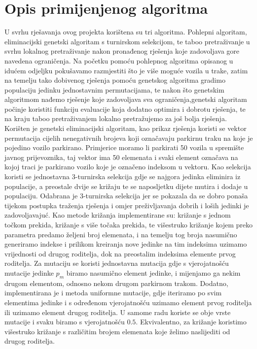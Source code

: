 \documentclass[11pt]{article}
\begin{document}
\section{Opis primijenjenog algoritma}
U svrhu rješavanja ovog projekta korištena su tri algoritma. Pohlepni algoritam, eliminacijski genetski algoritam s turnirskom selekcijom, te taboo pretraživanje u svrhu lokalnog pretraživanje nakon pronađenog rješenja koje zadovoljava gore navedena ograničenja. Na početku pomoću pohlepnog algoritma opisanog u idućem odjeljku pokušavamo razmjestiti što je više moguće vozila u trake, zatim na temelju tako dobivenog rješenja pomoću genetskog algoritma gradimo populaciju jedinku jednostavnim permutacijama, te nakon što genetskim algoritmom nađemo rješenje koje zadovoljava sva ograničenja,genetski algoritam počinje koristiti funkciju evaluacije koja dodatno optimira i dobrotu rješenja, te na kraju taboo pretraživanjem lokalno pretražujemo za još bolja rješenja. Korišten je genetski eliminacijski algoritam, kao prikaz rješenja koristi se vektor permutacija cijelih nenegativnih brojeva koji označavaju parkirnu traku na koje je pojedino vozilo parkirano. Primjerice moramo li parkirati 50 vozila u spremište javnog prijevoznika, taj vektor ima 50 elemenata i svaki element označava na kojoj traci je parkirano vozilo koje je označeno indeksom u vektoru. Kao selekcija koristi se jednostavna 3-turnirska selekcija gdje se najgora jedinka eliminira iz populacije, a preostale dvije se križaju te se naposljetku dijete mutira i dodaje u populaciju. Odabrana je 3-turnirska selekcija jer se pokazala da se dobro ponaša tijekom postupka traženja rješenja i omjer preživljavanja dobrih i loših jedinki je zadovoljavajuć. Kao metode križanja implementirane su: križanje s jednom točkom prekida, križanje s više točaka prekida, te višestruko križanje kojem preko parametra predamo željeni broj elemenata, i na temelju tog broja nasumično generiramo indekse i prilikom kreiranja nove jedinke na tim indeksima uzimamo vrijednosti od drugog roditelja, dok na preostalim indeksima elemente prvog roditelja. Za mutaciju se koristi jednostavna mutacija gdje s vjerojatnošću mutacije jedinke $p_m$ biramo nasumično element jedinke, i mijenjamo ga nekim drugom elementom, odnosno nekom drugom parkirnom trakom. Dodatno, implementirana je i metoda uniformne mutacije, gdje iteriramo po svim elementima jedinke i s određenom vjerojatnošću uzimamo element prvog roditelja ili uzimamo element drugog roditelja. U samome radu koriste se obje vrste mutacije i svaku biramo s vjerojatnošću $0.5$. Ekvivalentno, za križanje koristimo višestruko križanje s različitim brojem elemenata koje želimo naslijediti od drugog roditelja.
\end{document}
